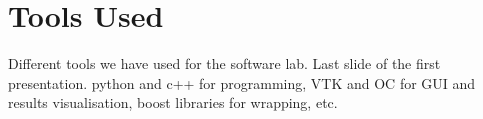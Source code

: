 \section{Tools Used}
Different tools we have used for the software lab. Last slide of the first presentation. python and c++ for programming, VTK and OC for GUI and results visualisation, boost libraries for wrapping, etc.